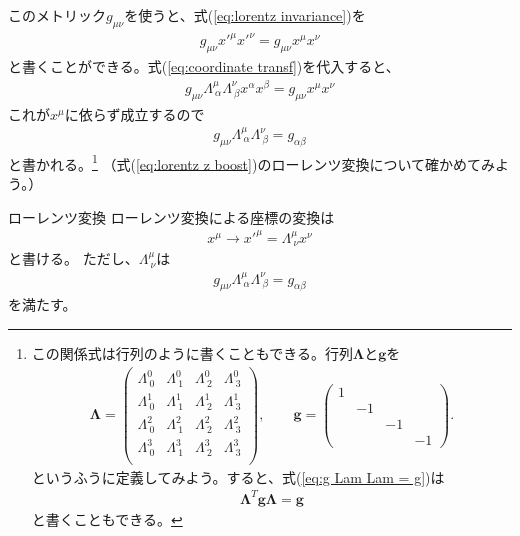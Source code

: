 \documentclass[10pt,a4paper]{jarticle}
\begin{document}
このメトリック$g_{\mu\nu}$を使うと、式(\ref{eq:lorentz invariance})を
\begin{align}
g_{\mu\nu} x'^\mu x'^\nu = g_{\mu\nu} x^\mu x^\nu
\end{align}
と書くことができる。式(\ref{eq:coordinate transf})を代入すると、
\begin{align}
g_{\mu\nu} \Lambda^\mu_{~\alpha} \Lambda^\nu_{~\beta} x^\alpha x^\beta = g_{\mu\nu} x^\mu x^\nu
\end{align}
これが$x^\mu$に依らず成立するので
\begin{align}
g_{\mu\nu} \Lambda^\mu_{~\alpha} \Lambda^\nu_{~\beta} = g_{\alpha\beta} \label{eq:g Lam Lam = g}
\end{align}
と書かれる。\footnote{この関係式は行列のように書くこともできる。行列$\mathbf\Lambda$と$\mathbf g$を
\begin{align}
\mathbf{\Lambda}
=
\left(\begin{array}{cccc}
\Lambda^0_{~0} & \Lambda^0_{~1} & \Lambda^0_{~2} & \Lambda^0_{~3} \\
\Lambda^1_{~0} & \Lambda^1_{~1} & \Lambda^1_{~2} & \Lambda^1_{~3} \\
\Lambda^2_{~0} & \Lambda^2_{~1} & \Lambda^2_{~2} & \Lambda^2_{~3} \\
\Lambda^3_{~0} & \Lambda^3_{~1} & \Lambda^3_{~2} & \Lambda^3_{~3} \\
\end{array}\right), \qquad
%
\mathbf{g}
=
\left(\begin{array}{cccc}
1 &&& \\
& -1 && \\
&& -1 & \\
&&& -1
\end{array}\right).
\end{align}
というふうに定義してみよう。すると、式(\ref{eq:g Lam Lam = g})は
\begin{align}
\mathbf{\Lambda}^T
\mathbf{g}
\mathbf{\Lambda}
=
\mathbf{g}
\end{align}
と書くこともできる。}
（式(\ref{eq:lorentz z boost})のローレンツ変換について確かめてみよう。）

\begin{itembox}[l]{ローレンツ変換}
ローレンツ変換による座標の変換は
\begin{align}
x^\mu \to x'^\mu = \Lambda^\mu_{~\nu} x^\nu
\end{align}
と書ける。
ただし、$\Lambda^\mu_{~\nu}$は
\begin{align}
g_{\mu\nu} \Lambda^\mu_{~\alpha} \Lambda^\nu_{~\beta} = g_{\alpha\beta} \label{eq:g Lam Lam = g}
\end{align}
を満たす。
\end{itembox}
\end{document}
